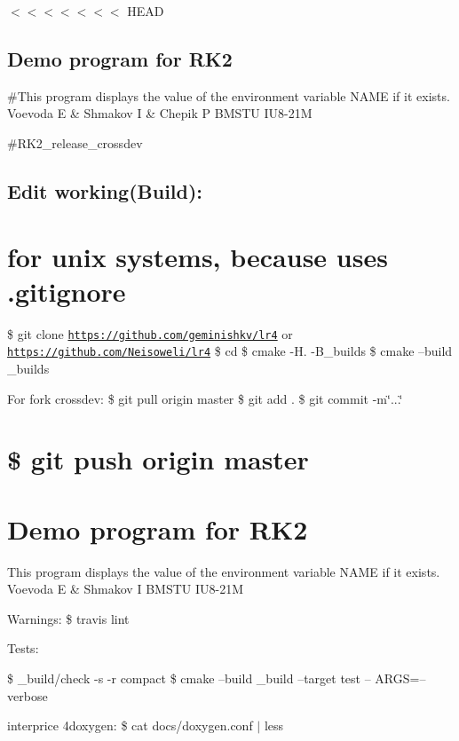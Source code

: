 $<$$<$$<$$<$$<$$<$$<$ H\+E\+AD \subsection*{Demo program for R\+K2}

\#\+This program displays the value of the environment variable N\+A\+ME if it exists. Voevoda E \& Shmakov I \& Chepik P B\+M\+S\+TU I\+U8-\/21M

\href{https://travis-ci.org/geminishkv/lr4}{\tt }

\#\+R\+K2\+\_\+release\+\_\+crossdev

\subsection*{Edit working(\+Build)\+:}

\section*{for unix systems, because uses .gitignore}

\$ git clone \href{https://github.com/geminishkv/lr4}{\tt https\+://github.\+com/geminishkv/lr4} or \href{https://github.com/Neisoweli/lr4}{\tt https\+://github.\+com/\+Neisoweli/lr4} \$ cd \$ cmake -\/H. -\/\+B\+\_\+builds \$ cmake --build \+\_\+builds

For fork crossdev\+: \$ git pull origin master \$ git add . \$ git commit -\/m\char`\"{}...\char`\"{} \section*{\$ git push origin master }

\section*{Demo program for R\+K2}

This program displays the value of the environment variable N\+A\+ME if it exists. Voevoda E \& Shmakov I B\+M\+S\+TU I\+U8-\/21M

Warnings\+: \$ travis lint

Tests\+:

\$ \+\_\+build/check -\/s -\/r compact \$ cmake --build \+\_\+build --target test -- A\+R\+GS=--verbose

interprice 4doxygen\+: \$ cat docs/doxygen.\+conf $\vert$ less 